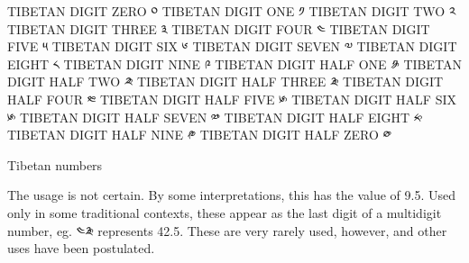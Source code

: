 {
\obeylines
\small
TIBETAN DIGIT ZERO	༠
TIBETAN DIGIT ONE	༡	
TIBETAN DIGIT TWO	༢	
TIBETAN DIGIT THREE	༣	
TIBETAN DIGIT FOUR	༤	
TIBETAN DIGIT FIVE	༥	
TIBETAN DIGIT SIX	༦	
TIBETAN DIGIT SEVEN	༧	
TIBETAN DIGIT EIGHT	༨	
TIBETAN DIGIT NINE	༩	
TIBETAN DIGIT HALF ONE	\tibetan༪	
TIBETAN DIGIT HALF TWO	༫	
TIBETAN DIGIT HALF THREE	༬
TIBETAN DIGIT HALF FOUR ༭	
TIBETAN DIGIT HALF FIVE ༯	
TIBETAN DIGIT HALF SIX	 ༯	
TIBETAN DIGIT HALF SEVEN	༰	
TIBETAN DIGIT HALF EIGHT	༱	
TIBETAN DIGIT HALF NINE	༲	
TIBETAN DIGIT HALF ZERO	༳	
}


Tibetan numbers

The usage is not certain. By some interpretations, this has the value of 9.5. Used only in some traditional contexts, these appear as the last digit of a multidigit number, eg. ༤༬ represents 42.5. These are very rarely used, however, and other uses have been postulated.

